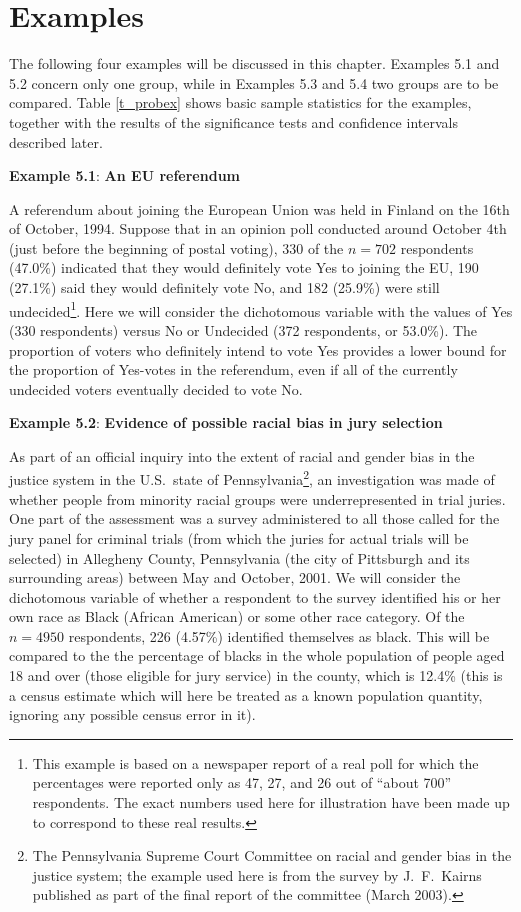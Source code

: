\section{Examples}
\label{s_probs_examples}

The following four examples will be discussed in this chapter. Examples
5.1 and 5.2 concern only one group, while in Examples 5.3
and 5.4 two groups are to be compared. Table \ref{t_probex} shows basic
sample statistics for the examples, together with the results of the
significance tests and confidence intervals described later.

\textbf{Example 5.1}: \textbf{An EU referendum}

A referendum about joining the European Union was held in Finland on the
16th of October, 1994. Suppose that in an opinion poll conducted around October 4th
(just before the beginning of postal voting), 330 of the $n=702$
respondents (47.0\%) indicated that they would definitely vote Yes to
joining the EU, 190 (27.1\%) said they would definitely vote No, and 182
(25.9\%) were still undecided\footnote{This example is based on a
newspaper report of a real poll for which the percentages were reported
only as 47, 27, and 26 out of ``about 700'' respondents. The exact
numbers used here for illustration have been made up to correspond to
these real results.}. Here we will consider the dichotomous variable with the
values of Yes (330 respondents) versus No or Undecided (372 respondents,
or 53.0\%). The proportion of voters who definitely intend to vote Yes
provides a lower bound for the proportion of Yes-votes in the
referendum, even if all of the currently undecided voters eventually
decided to vote No.

\textbf{Example 5.2}: \textbf{Evidence of possible racial
bias in jury selection}

As part of an official inquiry into the extent of racial and gender bias
in the justice system in the U.S.\ state of Pennsylvania\footnote{ The
Pennsylvania Supreme Court Committee on racial and gender bias in the
justice system; the example used here is from the survey by J.\ F.\
Kairns published as part of the final report of the committee (March
2003).},
an
investigation was made of whether people from minority racial groups
were underrepresented in trial juries. One part of the assessment was
a survey administered to all those called for the jury panel for
criminal trials (from which the juries for actual trials will be
selected) in Allegheny County, Pennsylvania (the city of Pittsburgh and
its surrounding areas) between May and October, 2001. We will consider
the dichotomous variable of whether a respondent to the survey identified
his or her own race as Black (African American) or some other race
category. Of the $n=4950$ respondents, 226 (4.57\%) identified
themselves as black. This will be compared to the the percentage of
blacks in the whole population of people aged 18 and over (those eligible
for jury service) in the county, which is 12.4\% (this is a census
estimate which will here be treated as a known population quantity,
ignoring any possible census error in it).

